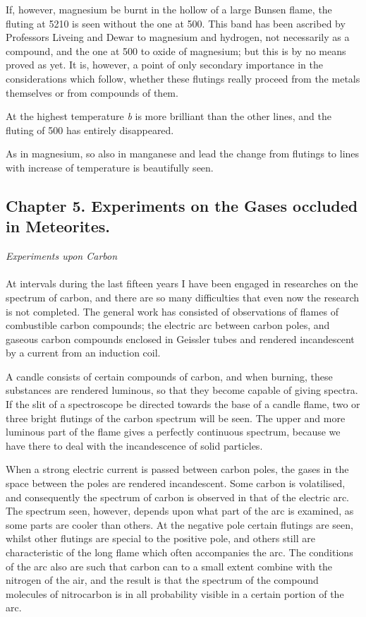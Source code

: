 \documentclass[a4paper, 12pt, oneside, polutonikogreek, english]{article}
\begin{document}
If, however, magnesium be burnt in the hollow of a large Bunsen flame, the fluting at 5210 is seen without the one at 500. This band has been ascribed by Professors Liveing and Dewar to magnesium and hydrogen, not necessarily as a compound, and the one at 500 to oxide of magnesium; but this is by no means proved as yet. It is, however, a point of only secondary importance in the considerations which follow, whether these flutings really proceed from the metals themselves or from compounds of them.

At the highest temperature \emph{b} is more brilliant than the other lines, and the fluting of 500 has entirely disappeared.

As in magnesium, so also in manganese and lead the change from flutings to lines with increase of temperature is beautifully seen.
\clearpage
\subsection{Chapter 5. Experiments on the Gases occluded in Meteorites.}
\begin{center}
\emph{Experiments upon Carbon}
\end{center}
\paragraph{}
At intervals during the last fifteen years I have been engaged in researches on the spectrum of carbon, and there are so many difficulties that even now the research is not completed. The general work has consisted of observations of flames of combustible carbon compounds; the electric arc between carbon poles, and gaseous carbon compounds enclosed in Geissler tubes and rendered incandescent by a current from an induction coil.

A candle consists of certain compounds of carbon, and when burning, these substances are rendered luminous, so that they become capable of giving spectra. If the slit of a spectroscope be directed towards the base of a candle flame, two or three bright flutings of the carbon spectrum will be seen. The upper and more luminous part of the flame gives a perfectly continuous spectrum, because we have there to deal with the incandescence of solid particles.

When a strong electric current is passed between carbon poles, the gases in the space between the poles are rendered incandescent. Some carbon is volatilised, and consequently the spectrum of carbon is observed in that of the electric arc. The spectrum seen, however, depends upon what part of the arc is examined, as some parts are cooler than others. At the negative pole certain flutings are seen, whilst other flutings are special to the positive pole, and others still are characteristic of the long flame which often accompanies the arc. The conditions of the arc also are such that carbon can to a small extent combine with the nitrogen of the air, and the result is that the spectrum of the compound molecules of nitrocarbon is in all probability visible in a certain portion of the arc.
\end{document}
